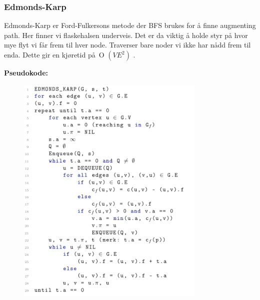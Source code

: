 \documentclass[12pt]{report}
\begin{document}

\par


\vspace{\baselineskip}
\setlength{\parskip}{6.0pt}

\vspace{\baselineskip}\subsubsection*{Edmonds-Karp}
\setlength{\parskip}{0.0pt}
Edmonds-Karp er Ford-Fulkersons metode der BFS brukes for å finne augmenting path. Her finner vi flaskehalsen underveis. Det er da viktig å holde styr på hvor mye flyt vi får frem til hver node. Traverser bare noder vi ikke har nådd frem til enda. Dette gir en kjøretid på O \(  \left( VE^{2} \right)  \) .\par


\vspace{\baselineskip}
{\fontsize{13pt}{15.6pt}\selectfont \textbf{Pseudokode:}\par}\par


\vspace{\baselineskip}



\begin{figure}[H]
	\begin{Center}
		\includegraphics[width=3.55in,height=4.4in]{./media/image150.png}
	\end{Center}
\end{figure}
\end{document}
